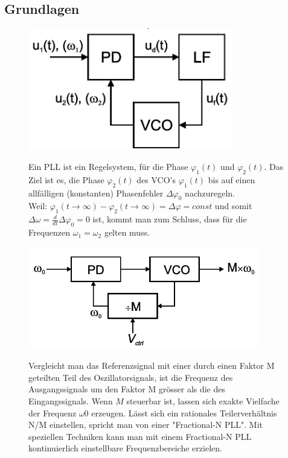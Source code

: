 \subsection{Grundlagen}
\begin{figure}[h!]
	\begin{minipage}{0.25\textwidth} 
       \includegraphics[width=0.8\textwidth]{images/Prinzip_PLL}\\
	\end{minipage}
	\begin{minipage}{0.75\textwidth}
	   Ein PLL ist ein Regelsystem, für die Phase $\varphi_1(t)$ und $\varphi_2(t)$. Das Ziel ist es, die Phase $\varphi_2(t)$ des  VCO's $\varphi_1(t)$ bis auf einen allfälligen (konstanten) Phasenfehler $\Delta \varphi_0$ nachzuregeln.\\
       Weil: $\varphi _1(t\to \infty ) - \varphi_2(t \to \infty)= \Delta \varphi = const$ und somit $\Delta \omega = \frac{d}{dt}\Delta \varphi_0 = 0$ ist, kommt man zum Schluss, dass für die Frequenzen $\omega_1 = \omega_2$ gelten muss.
	\end{minipage}

    \begin{minipage}{0.4\textwidth} 
       \includegraphics[width=0.9\textwidth]{images/Hohe_Frequ}\\
    \end{minipage}
    \begin{minipage}{0.6\textwidth}
      Vergleicht man das Referenzsignal mit einer durch einen Faktor M geteilten Teil des Oszillatorsignals, ist die Frequenz des Ausgangssignals um den Faktor M grösser als die des Eingangssignals. Wenn $M$ steuerbar ist, lassen sich exakte Vielfache der Frequenz $\omega0$ erzeugen. Lässt sich ein rationales Teilerverhältnis N/M einstellen, spricht man von einer "Fractional-N PLL". Mit speziellen Techniken kann man mit einem Fractional-N PLL kontinuierlich einstellbare Frequenzbereiche erzielen.
    \end{minipage}
\end{figure}

